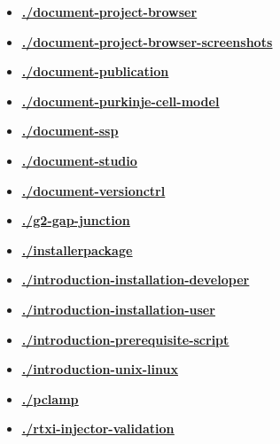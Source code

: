 \documentclass[12pt]{article}
\begin{document}
\begin{itemize}
\item \href{.././document-project-browser/./document-project-browser.pdf}{\bf \underline{./document-project-browser}}

\item \href{.././document-project-browser-screenshots/./document-project-browser-screenshots.pdf}{\bf \underline{./document-project-browser-screenshots}}

\item \href{.././document-publication/./document-publication.pdf}{\bf \underline{./document-publication}}

\item \href{.././document-purkinje-cell-model/./document-purkinje-cell-model.pdf}{\bf \underline{./document-purkinje-cell-model}}

\item \href{.././document-ssp/./document-ssp.pdf}{\bf \underline{./document-ssp}}

\item \href{.././document-studio/./document-studio.pdf}{\bf \underline{./document-studio}}

\item \href{.././document-versionctrl/./document-versionctrl.pdf}{\bf \underline{./document-versionctrl}}

\item \href{.././g2-gap-junction/./g2-gap-junction.pdf}{\bf \underline{./g2-gap-junction}}

\item \href{.././installerpackage/./installerpackage.pdf}{\bf \underline{./installerpackage}}

\item \href{.././introduction-installation-developer/./introduction-installation-developer.pdf}{\bf \underline{./introduction-installation-developer}}

\item \href{.././introduction-installation-user/./introduction-installation-user.pdf}{\bf \underline{./introduction-installation-user}}

\item \href{.././introduction-prerequisite-script/./introduction-prerequisite-script.pdf}{\bf \underline{./introduction-prerequisite-script}}

\item \href{.././introduction-unix-linux/./introduction-unix-linux.pdf}{\bf \underline{./introduction-unix-linux}}

\item \href{.././pclamp/./pclamp.pdf}{\bf \underline{./pclamp}}

\item \href{.././rtxi-injector-validation/./rtxi-injector-validation.pdf}{\bf \underline{./rtxi-injector-validation}}


\end{itemize}

\end{document}
